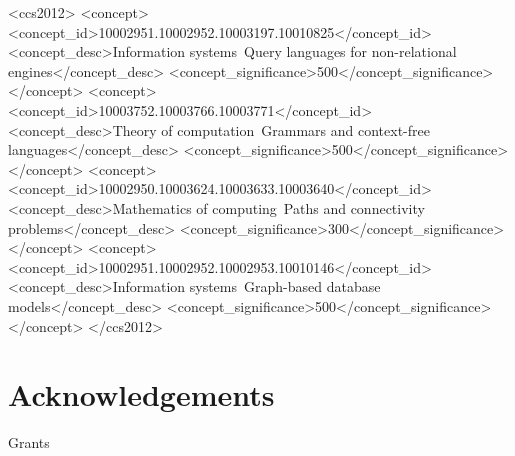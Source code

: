 \documentclass[sigconf,edbt,table]{acmart-edbt2021}
\begin{document}
%
\begin{CCSXML}
		<ccs2012>
		<concept>
			<concept_id>10002951.10002952.10003197.10010825</concept_id>
			<concept_desc>Information systems~Query languages for non-relational engines</concept_desc>
			<concept_significance>500</concept_significance>
		</concept>
		<concept>
			<concept_id>10003752.10003766.10003771</concept_id>
			<concept_desc>Theory of computation~Grammars and context-free languages</concept_desc>
			<concept_significance>500</concept_significance>
		</concept>
		<concept>
			<concept_id>10002950.10003624.10003633.10003640</concept_id>
			<concept_desc>Mathematics of computing~Paths and connectivity problems</concept_desc>
			<concept_significance>300</concept_significance>
		</concept>
		<concept>
			<concept_id>10002951.10002952.10002953.10010146</concept_id>
			<concept_desc>Information systems~Graph-based database models</concept_desc>
			<concept_significance>500</concept_significance>
		</concept>
		</ccs2012>
\end{CCSXML}
	




\maketitle





%


\section*{Acknowledgements}
Grants 
\end{document}
